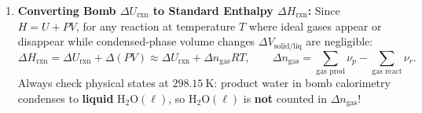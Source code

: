 \begin{enumerate}
  \item \textbf{Converting Bomb $\Delta U_{\mathrm{rxn}}$ to Standard Enthalpy $\Delta H_{\mathrm{rxn}}$:}
  Since $H = U + PV$, for any reaction at temperature $T$ where ideal gases appear or disappear while condensed-phase volume changes $\Delta V_{\mathrm{solid/liq}}$ are negligible:
  \begin{equation}\label{eq:04:du2dh}
    \Delta H_{\mathrm{rxn}} = \Delta U_{\mathrm{rxn}} + \Delta(PV) \approx \Delta U_{\mathrm{rxn}} + \Delta n_{\mathrm{gas}} R T, \qquad
    \Delta n_{\mathrm{gas}} = \sum_{\text{gas prod}} \nu_p - \sum_{\text{gas react}} \nu_r.
  \end{equation}
  Always check physical states at $\SI{298.15}{\kelvin}$: product water in bomb calorimetry condenses to \textbf{liquid} $\mathrm{H_2O(\ell)}$, so $\mathrm{H_2O(\ell)}$ is \textbf{not} counted in $\Delta n_{\mathrm{gas}}$!
\end{enumerate}

